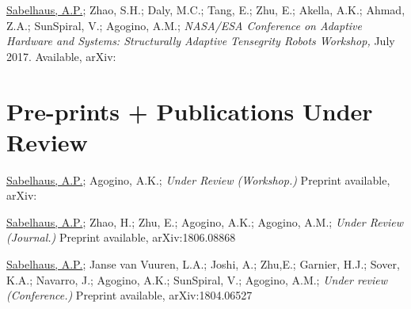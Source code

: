 \documentclass[letterpaper]{deedy-resume} %
\begin{document}
\begin{etaremune}


\item {} \underline{Sabelhaus, A.P.}; Zhao, S.H.; Daly, M.C.; Tang, E.; Zhu, E.; Akella, A.K.; Ahmad, Z.A.; SunSpiral, V.; Agogino, A.M.; {\it NASA/ESA Conference on Adaptive Hardware and Systems: Structurally Adaptive Tensegrity Robots Workshop,} July 2017. Available, arXiv: 
  
\end{etaremune}




\section{Pre-prints + Publications Under Review}

\begin{etaremune}

\item {} \underline{Sabelhaus, A.P.}; Agogino, A.K.; {\it Under Review (Workshop.)} Preprint available, arXiv:
  
\item {} \underline{Sabelhaus, A.P.}; Zhao, H.; Zhu, E.; Agogino, A.K.; Agogino, A.M.; {\it Under Review (Journal.)} Preprint available, arXiv:1806.08868

\item {} \underline{Sabelhaus, A.P.}; Janse van Vuuren, L.A.; Joshi, A.; Zhu,E.; Garnier, H.J.; Sover, K.A.; Navarro, J.; Agogino, A.K.; SunSpiral, V.; Agogino, A.M.; {\it Under review (Conference.)} Preprint available, arXiv:1804.06527 

\end{etaremune}  

  
\end{document}
